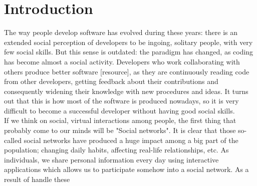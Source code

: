 \documentclass[a4paper, 12pt]{book}
\begin{document}
\tableofcontents
\cleardoublepage
\listoffigures %



\cleardoublepage
\chapter{Introduction}
\label{sec:intro} %
The way people develop software has evolved during these years: there is an extended social perception of developers to
be ingoing, solitary people, with very few social skills. But this sense is outdated: the paradigm has changed,
as coding has become almost a social activity. Developers who work collaborating with others produce better software [resource], as they
are continuously reading code from other developers, getting feedback about their contributions and consequently
widening their knowledge with new procedures and ideas. It turns out that this is how most of the software is produced nowadays,
so it is very difficult to become a successful developer without having good social skills.\\
If we think on social, virtual interactions among people, the first thing that probably come to our minds will be
"Social networks". It is clear that those so-called social networks have produced a huge impact among a big part of the
population; changing daily habits, affecting real-life relationships, etc. As individuals, we share personal information every
day using interactive applications which allows us to participate somehow into a social network. As a result of handle these
\end{document}
